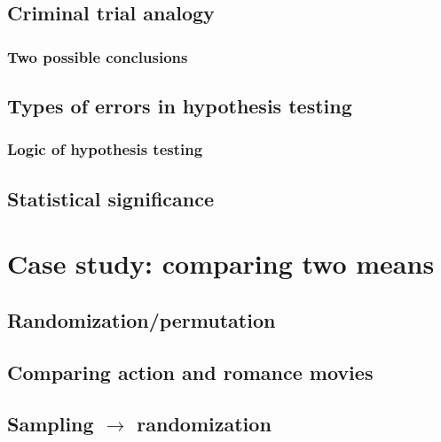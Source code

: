 \documentclass[
  12pt, krantz2,
]{krantz}
\begin{document}
\hypertarget{trial}{%
\subsection{Criminal trial analogy}\label{trial}}

\hypertarget{two-possible-conclusions}{%
\subsubsection*{Two possible conclusions}\label{two-possible-conclusions}}


\hypertarget{types-of-errors-in-hypothesis-testing}{%
\subsection{Types of errors in hypothesis testing}\label{types-of-errors-in-hypothesis-testing}}

\hypertarget{logic-of-hypothesis-testing}{%
\subsubsection*{Logic of hypothesis testing}\label{logic-of-hypothesis-testing}}


\hypertarget{statistical-significance}{%
\subsection{Statistical significance}\label{statistical-significance}}

\hypertarget{ht-case-study}{%
\section{Case study: comparing two means}\label{ht-case-study}}

\hypertarget{randomizationpermutation}{%
\subsection{Randomization/permutation}\label{randomizationpermutation}}

\hypertarget{comparing-action-and-romance-movies}{%
\subsection{Comparing action and romance movies}\label{comparing-action-and-romance-movies}}

\hypertarget{sampling-rightarrow-randomization}{%
\subsection{\texorpdfstring{Sampling \(\rightarrow\) randomization}{Sampling \textbackslash rightarrow randomization}}\label{sampling-rightarrow-randomization}}
\end{document}

